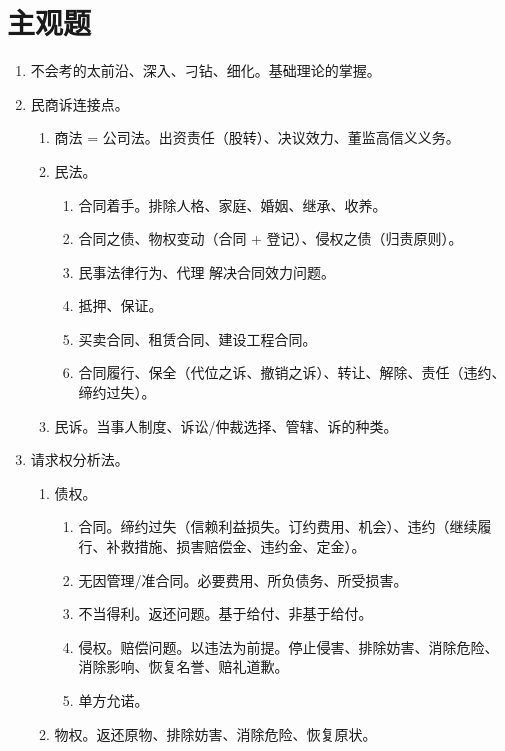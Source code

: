 \section{主观题}
\begin{enumerate}
  \item 不会考的太前沿、深入、刁钻、细化。基础理论的掌握。
  \item 民商诉连接点。
        \begin{enumerate}
          \item 商法 = 公司法。出资责任（股转）、决议效力、董监高信义义务。
          \item 民法。
                \begin{enumerate}
                  \item 合同着手。排除人格、家庭、婚姻、继承、收养。
                  \item 合同之债、物权变动（合同 + 登记）、侵权之债（归责原则）。
                  \item 民事法律行为、代理 \yjt 解决合同效力问题。
                  \item 抵押、保证。
                  \item 买卖合同、租赁合同、建设工程合同。
                  \item 合同履行、保全（代位之诉、撤销之诉）、转让、解除、责任（违约、缔约过失）。
                \end{enumerate}
          \item 民诉。当事人制度、诉讼/仲裁选择、管辖、诉的种类。
        \end{enumerate}
  \item 请求权分析法。
        \begin{enumerate}
          \item 债权。
                \begin{enumerate}
                  \item 合同。缔约过失（信赖利益损失。订约费用、机会）、违约（继续履行、补救措施、损害赔偿金、违约金、定金）。
                  \item 无因管理/准合同。必要费用、所负债务、所受损害。
                  \item 不当得利。返还问题。基于给付、非基于给付。
                  \item 侵权。赔偿问题。以违法为前提。停止侵害、排除妨害、消除危险、消除影响、恢复名誉、赔礼道歉。
                  \item 单方允诺。
                \end{enumerate}
          \item 物权。返还原物、排除妨害、消除危险、恢复原状。

\end{enumerate}
\end{enumerate}
